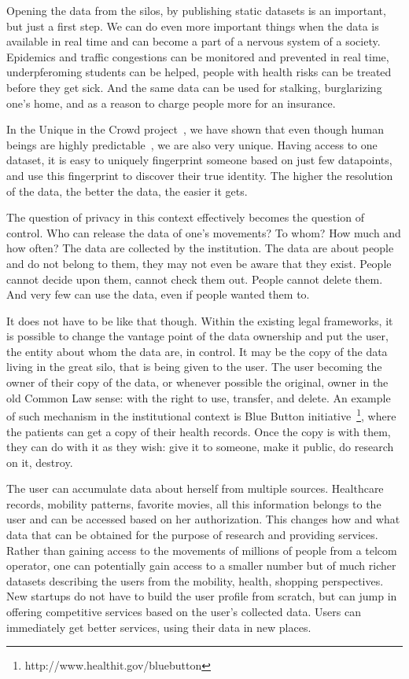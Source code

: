 Opening the data from the silos, by publishing static datasets is an important, but just a first step. 
We can do even more important things when the data is available in real time and can become a part of a nervous system of a society.
Epidemics and traffic congestions can be monitored and prevented in real time, underpferoming students can be helped, people with health risks can be treated before they get sick.
And the same data can be used for stalking, burglarizing one's home, and as a reason to charge people more for an insurance.

In the Unique in the Crowd project~\cite{de2013unique}, we have shown that even though human beings are highly predictable~\cite{song2010limits}, we are also very unique.
Having access to one dataset, it is easy to uniquely fingerprint someone based on just few datapoints, and use this fingerprint to discover their true identity. 
The higher the resolution of the data, the better the data, the easier it gets.

The question of privacy in this context effectively becomes the question of control. 
Who can release the data of one's movements?
To whom? 
How much and how often?
The data are collected by the institution.
The data are about people and do not belong to them, they may not even be aware that they exist.
People cannot decide upon them, cannot check them out.
People cannot delete them.
And very few can use the data, even if people wanted them to.

It does not have to be like that though.
Within the existing legal frameworks, it is possible to change the vantage point of the data ownership and put the user, the entity about whom the data are, in control.
It may be the copy of the data living in the great silo, that is being given to the user.
The user becoming the owner of their copy of the data, or whenever possible the original, owner in the old Common Law sense: with the right to use, transfer, and delete. 
An example of such mechanism in the institutional context is Blue Button initiative~\footnote{http://www.healthit.gov/bluebutton}, where the patients can get a copy of their health records.
Once the copy is with them, they can do with it as they wish: give it to someone, make it public, do research on it, destroy.

The user can accumulate data about herself from multiple sources. 
Healthcare records, mobility patterns, favorite movies, all this information belongs to the user and can be accessed based on her authorization.
This changes how and what data that can be obtained for the purpose of research and providing services.
Rather than gaining access to the movements of millions of people from a telcom operator, one can potentially gain access to a smaller number but of much richer datasets describing the users from the mobility, health, shopping  perspectives.
New startups do not have to build the user profile from scratch, but can jump in offering competitive services based on the user's collected data.
Users can immediately get better services, using their data in new places.

